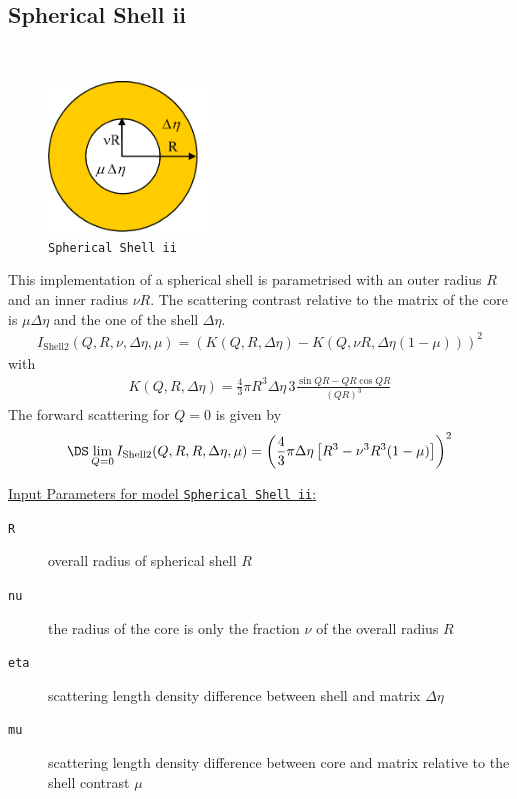 \clearpage
\subsection{Spherical Shell ii}
\label{sect:spherical_shell_ii} ~\\

\begin{figure}[htb]
\begin{center}
\includegraphics[width=0.38\textwidth,height=0.3575\textwidth]{../images/form_factor/spheres/shell2.png}
\end{center}
\caption{\texttt{Spherical Shell ii}} \label{fig:shell2}
\end{figure}
This implementation of a spherical shell is parametrised with an outer radius $R$ and an inner
radius $\nu R$. The scattering contrast relative to the matrix of the core is $ \mu \Delta \eta$
and the one of the shell $\Delta\eta$.
\begin{align}
I_\text{Shell2}(Q,R,\nu,\Delta\eta,\mu)=
\left(K(Q,R,\Delta\eta)-K(Q,\nu R,\Delta\eta(1-\mu))\right)^2
\end{align}
with
\begin{align}
 K(Q,R,\Delta\eta) = \frac{4}{3}\pi R^3 \Delta\eta \, 3 \frac{\sin QR - QR \cos QR}{(QR)^3}
\end{align}
The forward scattering for $Q=0$ is given by
$$
\DS \lim_{Q=0}I_\text{Shell2}(Q,R,R,\Delta\eta,\mu) =
\left(\frac{4}{3}\pi \Delta\eta \left[ R^3 - \nu^3
R^3(1-\mu)\right]\right)^2
$$

\vspace{5mm}
\noindent \underline{Input Parameters for model \texttt{Spherical Shell ii}:}
\begin{description}
\item[\texttt{R}] overall radius of spherical shell $R$
\item[\texttt{nu}] the radius of the core is only the fraction $\nu$ of the overall radius  $R$
\item[\texttt{eta}] scattering length density difference between shell and matrix $\Delta\eta$
\item[\texttt{mu}] scattering length density difference between core and matrix relative to the shell contrast $\mu$
\end{description}

